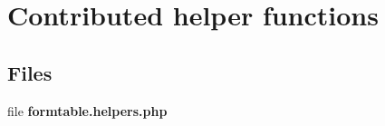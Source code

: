 \section{Contributed helper functions}
\label{group__OWL__CONTRIB}
\subsection*{Files}
\begin{DoxyCompactItemize}
\item 
file {\bf formtable.helpers.php}
\end{DoxyCompactItemize}
